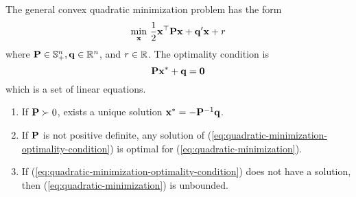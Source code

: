 \begin{example}
	The general convex quadratic minimization problem has the form
	\begin{equation}
		\min_{\mathbf{x}}\,\frac{1}{2}\mathbf{x}^{\top}\mathbf{P}\mathbf{x}+\mathbf{q}^{\prime}\mathbf{x}+r \label{eq:quadratic-minimization}
	\end{equation}
	where \(\mathbf{P}\in\mathbb{S}_{+}^{n},\mathbf{q}\in\mathbb{R}^{n}\), and \(r\in\mathbb{R}\). The optimality condition is
	\begin{equation}
		\mathbf{P}\mathbf{x}^{*}+\mathbf{q}=\mathbf{0}
		\label{eq:quadratic-minimization-optimality-condition}
	\end{equation}
	which is a set of linear equations.
	\begin{enumerate}
		\item If \(\mathbf{P}\succ 0\), exists a unique solution \(\mathbf{x}^{*}=-\mathbf{P}^{-1}\mathbf{q}\).
		\item If \(\mathbf{P}\) is not positive definite, any solution of (\ref{eq:quadratic-minimization-optimality-condition}) is optimal for (\ref{eq:quadratic-minimization}).
		\item If (\ref{eq:quadratic-minimization-optimality-condition}) does not have a solution, then (\ref{eq:quadratic-minimization}) is unbounded.
	\end{enumerate}
\end{example}

